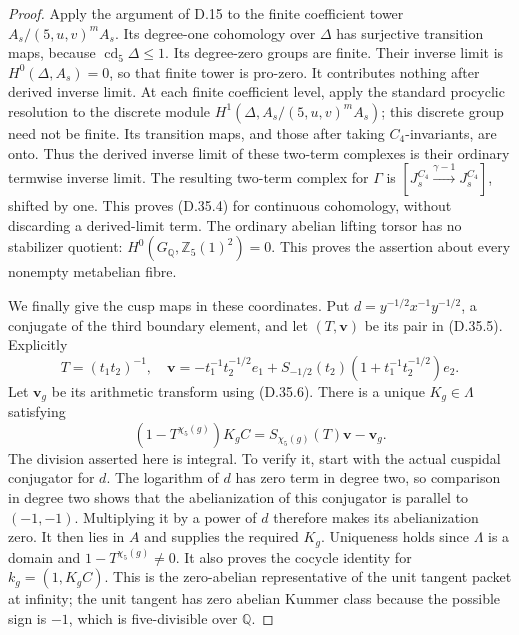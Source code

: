 \begin{proof}
Apply the argument of D.15 to the finite
coefficient tower \(A_s/(5,u,v)^mA_s\).
Its degree-one cohomology over \(\Delta\)
has surjective transition maps, because
\(\operatorname{cd}_5\Delta\le1\).
Its degree-zero groups are finite.
Their inverse limit is
\(H^0(\Delta,A_s)=0\), so that finite
tower is pro-zero. It contributes
nothing after derived inverse limit.
At each finite coefficient level, apply
the standard procyclic resolution to
the discrete module \(H^1(\Delta,A_s/(5,u,v)^mA_s)\);
this discrete group need not be finite.
Its transition maps, and those after
taking \(C_4\)-invariants, are onto.
Thus the derived inverse limit of
these two-term complexes is their
ordinary termwise inverse limit.
The resulting two-term complex for
\(\Gamma\) is
\([J_s^{C_4}\xrightarrow{\gamma-1}J_s^{C_4}]\),
shifted by one. This proves (D.35.4)
for continuous cohomology, without
discarding a derived-limit term.
The ordinary abelian lifting torsor
has no stabilizer quotient:
\(H^0(G_{\mathbb Q},\mathbb Z_5(1)^2)=0\).
This proves the assertion about every
nonempty metabelian fibre.

We finally give the cusp maps in these
coordinates. Put
\(d=y^{-1/2}x^{-1}y^{-1/2}\), a conjugate
of the third boundary element, and let
\((T,\mathbf v)\) be its pair in (D.35.5).
Explicitly
\[
 T=(t_1t_2)^{-1},\quad
 \mathbf v=-t_1^{-1}t_2^{-1/2}e_1
       +S_{-1/2}(t_2)(1+t_1^{-1}t_2^{-1/2})e_2.
 \]
Let \(\mathbf v_g\) be its arithmetic
transform using (D.35.6). There is a
unique \(K_g\in\Lambda\) satisfying
\[
       (1-T^{\chi_5(g)})K_g C
           = S_{\chi_5(g)}(T)\mathbf v-\mathbf v_g.
 \]
The division asserted here is integral.
To verify it, start with the actual
cuspidal conjugator for \(d\).
The logarithm of \(d\) has zero term
in degree two, so comparison in degree
two shows that the abelianization of
this conjugator is parallel to \((-1,-1)\).
Multiplying it by a power of \(d\)
therefore makes its abelianization zero.
It then lies in \(A\) and supplies
the required \(K_g\). Uniqueness holds
since \(\Lambda\) is a domain and
\(1-T^{\chi_5(g)}\ne0\).
It also proves the cocycle identity
for \(k_g=(1,K_g C)\).
This is the zero-abelian representative
of the unit tangent packet at infinity;
the unit tangent has zero abelian
Kummer class because the possible
sign is \(-1\), which is five-divisible
over \(\mathbb Q\).


\end{proof}
